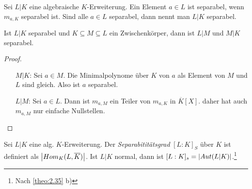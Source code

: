 \documentclass[../main.tex]{subfiles}
\begin{document}
\begin{definition} \label{theo:2.43}
    Sei $L|K$ eine algebraische $K$-Erweiterung.
    Ein Element $a\in L$ ist separabel, wenn $m_{a,K}$ separabel ist.
    Sind alle $a\in L$ separabel, dann nennt man $L|K$ separabel.
\end{definition}

\begin{lemma} \label{theo:2.44}
    Ist $L|K$ separabel und $K\subseteq M \subseteq L$ ein Zwischenkörper, dann ist $L|M$ und $M|K$ separabel.
\end{lemma}
\begin{proof}
    \begin{enumerate}
        \item[$M|K$:] Sei $a\in M$. Die Minimalpolynome über $K$ von $a$ als Element von $M$ und $L$ sind gleich. Also ist $a$ separabel.
        \item[$L|M$:] Sei $a\in L$. Dann ist $m_{a,M}$ ein Teiler von $m_{a,K}$ in $\overline{K}[X]$.
        daher hat auch $m_{a,M}$ nur einfache Nullstellen.
    \end{enumerate}
\end{proof}

\begin{definition}
    Sei $L|K$ eine alg. $K$-Erweiterung.
    Der \emph{Separabititätsgrad} $[L:K]_S$ über $K$ ist definiert als $\left\vert Hom_K(L,\overline{K}) \right\vert$.
    Ist $L|K$ normal, dann ist $[L:K]_s = \left\vert Aut(L|K) \right\vert$.\footnote{Nach \cref{theo:2.35} b)} 
\end{definition}
\end{document}
